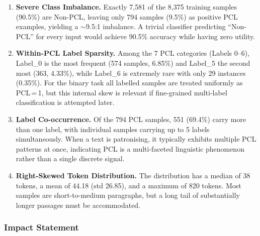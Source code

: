 \documentclass[11pt,a4paper]{article}
\begin{document}
\begin{enumerate}[noitemsep]
    \item \textbf{Severe Class Imbalance.} Exactly 7{,}581 of the 8{,}375 training samples (90.5\%) are Non-PCL, leaving only 794 samples (9.5\%) as positive PCL examples, yielding a $\sim$9.5:1 imbalance. A trivial classifier predicting ``Non-PCL'' for every input would achieve 90.5\% accuracy while having zero utility.

    \item \textbf{Within-PCL Label Sparsity.} Among the 7 PCL categories (Labels 0--6), Label\_0 is the most frequent (574 samples, 6.85\%) and Label\_5 the second most (363, 4.33\%), while Label\_6 is extremely rare with only 29 instances (0.35\%). For the binary task all labelled samples are treated uniformly as PCL\,=\,1, but this internal skew is relevant if fine-grained multi-label classification is attempted later.

    \item \textbf{Label Co-occurrence.} Of the 794 PCL samples, 551 (69.4\%) carry more than one label, with individual samples carrying up to 5 labels simultaneously. When a text is patronising, it typically exhibits multiple PCL patterns at once, indicating PCL is a multi-faceted linguistic phenomenon rather than a single discrete signal.

    \item \textbf{Right-Skewed Token Distribution.} The distribution has a median of 38 tokens, a mean of 44.18 (std 26.85), and a maximum of 820 tokens. Most samples are short-to-medium paragraphs, but a long tail of substantially longer passages must be accommodated.
\end{enumerate}

\subsubsection{Impact Statement}
\end{document}
